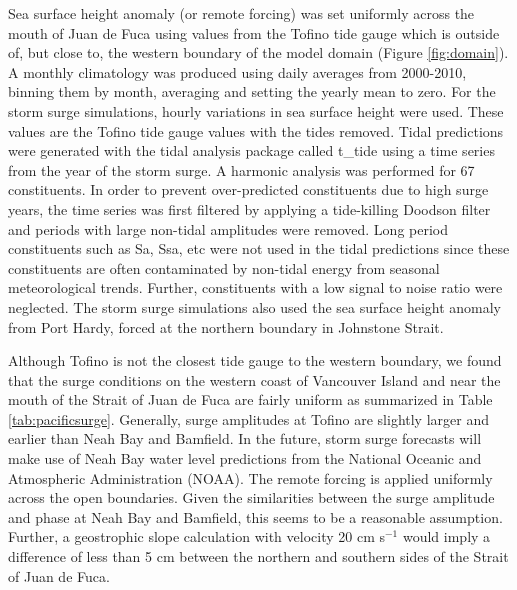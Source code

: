 \documentclass[letterpaper]{tATO2e}
\begin{document}
Sea surface height anomaly (or remote forcing) was set uniformly across the mouth of Juan de Fuca using values from the Tofino tide gauge \citep{DFOObservations} which is outside of, but close to, the western boundary of the model domain (Figure \ref{fig:domain}).  A monthly climatology was produced using daily averages from 2000-2010, binning them by month, averaging and setting the yearly mean to zero.  For the storm surge simulations, hourly variations in sea surface height were used.  These values are the Tofino tide gauge values with the tides removed. {\color{red}Tidal predictions were generated with the tidal analysis package called t\_tide \citep{pawlowicz2002classical} using a time series from the year of the storm surge. A harmonic analysis was performed for 67 constituents. In order to prevent over-predicted constituents due to high surge years, the time series was first filtered by applying a tide-killing Doodson filter \citep{parker2007NOAA} and periods with large non-tidal amplitudes were removed. Long period constituents such as Sa, Ssa, etc were not used in the tidal predictions since these constituents are often contaminated by non-tidal energy from seasonal meteorological trends. Further, constituents with a low signal to noise ratio were neglected. } The storm surge simulations also used the sea surface height anomaly from Port Hardy, forced at the northern boundary in Johnstone Strait. 

{\color{red} Although Tofino is not the closest tide gauge to the western boundary, we found that the surge conditions on the western coast of Vancouver Island and near the mouth of the Strait of Juan de Fuca are fairly uniform as summarized in Table \ref{tab:pacificsurge}. Generally, surge amplitudes at Tofino are slightly larger and earlier than Neah Bay and Bamfield. In the future, storm surge forecasts will make use of Neah Bay water level predictions from the National Oceanic and Atmospheric Administration (NOAA).  The remote forcing is applied uniformly across the open boundaries. Given the similarities between the surge amplitude and phase at Neah Bay and Bamfield, this seems to be a reasonable assumption. Further, a geostrophic slope calculation with velocity 20 cm s$^{-1}$ would imply a difference of less than 5 cm between the northern and southern sides of the Strait of Juan de Fuca.} 
\end{document}
